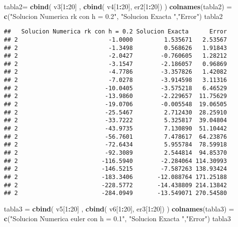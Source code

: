 \documentclass[]{article}
\newenvironment{Shaded}{\begin{snugshade}}{\end{snugshade}}
\newcommand{\KeywordTok}[1]{\textcolor[rgb]{0.13,0.29,0.53}{\textbf{#1}}}
\newcommand{\DecValTok}[1]{\textcolor[rgb]{0.00,0.00,0.81}{#1}}
\newcommand{\StringTok}[1]{\textcolor[rgb]{0.31,0.60,0.02}{#1}}
\newcommand{\OperatorTok}[1]{\textcolor[rgb]{0.81,0.36,0.00}{\textbf{#1}}}
\newcommand{\NormalTok}[1]{#1}
\begin{document}
\begin{Shaded}
\begin{Highlighting}[]
\NormalTok{tabla2=}\StringTok{ }\KeywordTok{cbind}\NormalTok{( v3[}\DecValTok{1}\OperatorTok{:}\DecValTok{20}\NormalTok{] , }\KeywordTok{cbind}\NormalTok{( v4[}\DecValTok{1}\OperatorTok{:}\DecValTok{20}\NormalTok{], er2[}\DecValTok{1}\OperatorTok{:}\DecValTok{20}\NormalTok{]) )}
\KeywordTok{colnames}\NormalTok{(tabla2) =}\StringTok{ }\KeywordTok{c}\NormalTok{(}\StringTok{"Solucion Numerica rk con h = 0.2"}\NormalTok{, }\StringTok{"Solucion Exacta "}\NormalTok{,}\StringTok{"Error"}\NormalTok{)}
\NormalTok{tabla2}
\end{Highlighting}
\end{Shaded}

\begin{verbatim}
##   Solucion Numerica rk con h = 0.2 Solucion Exacta      Error
## 2                          -1.0000         1.535671   2.53567
## 2                          -1.3498         0.568626   1.91843
## 2                          -2.0427        -0.760605   1.28212
## 2                          -3.1547        -2.186057   0.96869
## 2                          -4.7786        -3.357826   1.42082
## 2                          -7.0278        -3.914598   3.11316
## 2                         -10.0405        -3.575218   6.46529
## 2                         -13.9860        -2.229657  11.75629
## 2                         -19.0706        -0.005548  19.06505
## 2                         -25.5467         2.712430  28.25910
## 2                         -33.7222         5.325817  39.04804
## 2                         -43.9735         7.130890  51.10442
## 2                         -56.7601         7.478617  64.23876
## 2                         -72.6434         5.955784  78.59918
## 2                         -92.3089         2.544814  94.85370
## 2                        -116.5940        -2.284064 114.30993
## 2                        -146.5215        -7.587263 138.93424
## 2                        -183.3406       -12.088764 171.25188
## 2                        -228.5772       -14.438809 214.13842
## 2                        -284.0949       -13.549071 270.54580
\end{verbatim}

\begin{Shaded}
\begin{Highlighting}[]
\NormalTok{tabla3 =}\StringTok{ }\KeywordTok{cbind}\NormalTok{( v5[}\DecValTok{1}\OperatorTok{:}\DecValTok{20}\NormalTok{] , }\KeywordTok{cbind}\NormalTok{( v6[}\DecValTok{1}\OperatorTok{:}\DecValTok{20}\NormalTok{], er3[}\DecValTok{1}\OperatorTok{:}\DecValTok{20}\NormalTok{]) )}
\KeywordTok{colnames}\NormalTok{(tabla3) =}\StringTok{ }\KeywordTok{c}\NormalTok{(}\StringTok{"Solucion Numerica euler con h = 0.1"}\NormalTok{, }\StringTok{"Solucion Exacta "}\NormalTok{,}\StringTok{"Error"}\NormalTok{)}
\NormalTok{tabla3}
\end{Highlighting}
\end{Shaded}
\end{document}
